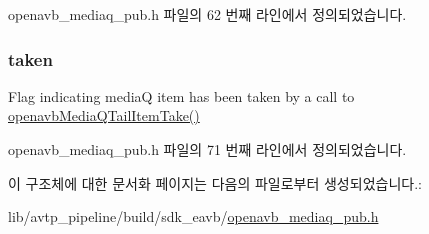 openavb\+\_\+mediaq\+\_\+pub.\+h 파일의 62 번째 라인에서 정의되었습니다.

\subsubsection[{\texorpdfstring{taken}{taken}}]{ taken}\hypertarget{structmedia__q__item__t_a2f82d1d1293c3de8527c67be4b2880f9}{}\label{structmedia__q__item__t_a2f82d1d1293c3de8527c67be4b2880f9}


Flag indicating mediaQ item has been taken by a call to \hyperlink{build_2sdk__eavb_2openavb__mediaq__pub_8h_a1cba0078992041670a37d66dddb86072}{openavb\+Media\+Q\+Tail\+Item\+Take()} 



openavb\+\_\+mediaq\+\_\+pub.\+h 파일의 71 번째 라인에서 정의되었습니다.



이 구조체에 대한 문서화 페이지는 다음의 파일로부터 생성되었습니다.\+:\begin{DoxyCompactItemize}
\item 
lib/avtp\+\_\+pipeline/build/sdk\+\_\+eavb/\hyperlink{build_2sdk__eavb_2openavb__mediaq__pub_8h}{openavb\+\_\+mediaq\+\_\+pub.\+h}\end{DoxyCompactItemize}
